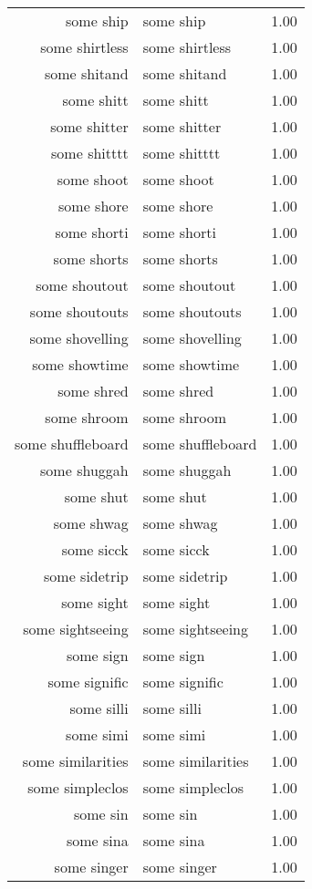 \begin{table}[ht]
\begin{tabular}{rlr}
  some ship & some ship & 1.00 \\ 
  some shirtless & some shirtless & 1.00 \\ 
  some shitand & some shitand & 1.00 \\ 
  some shitt & some shitt & 1.00 \\ 
  some shitter & some shitter & 1.00 \\ 
  some shitttt & some shitttt & 1.00 \\ 
  some shoot & some shoot & 1.00 \\ 
  some shore & some shore & 1.00 \\ 
  some shorti & some shorti & 1.00 \\ 
  some shorts & some shorts & 1.00 \\ 
  some shoutout & some shoutout & 1.00 \\ 
  some shoutouts & some shoutouts & 1.00 \\ 
  some shovelling & some shovelling & 1.00 \\ 
  some showtime & some showtime & 1.00 \\ 
  some shred & some shred & 1.00 \\ 
  some shroom & some shroom & 1.00 \\ 
  some shuffleboard & some shuffleboard & 1.00 \\ 
  some shuggah & some shuggah & 1.00 \\ 
  some shut & some shut & 1.00 \\ 
  some shwag & some shwag & 1.00 \\ 
  some sicck & some sicck & 1.00 \\ 
  some sidetrip & some sidetrip & 1.00 \\ 
  some sight & some sight & 1.00 \\ 
  some sightseeing & some sightseeing & 1.00 \\ 
  some sign & some sign & 1.00 \\ 
  some signific & some signific & 1.00 \\ 
  some silli & some silli & 1.00 \\ 
  some simi & some simi & 1.00 \\ 
  some similarities & some similarities & 1.00 \\ 
  some simpleclos & some simpleclos & 1.00 \\ 
  some sin & some sin & 1.00 \\ 
  some sina & some sina & 1.00 \\ 
  some singer & some singer & 1.00 \\ 

\end{tabular}
\end{table}
